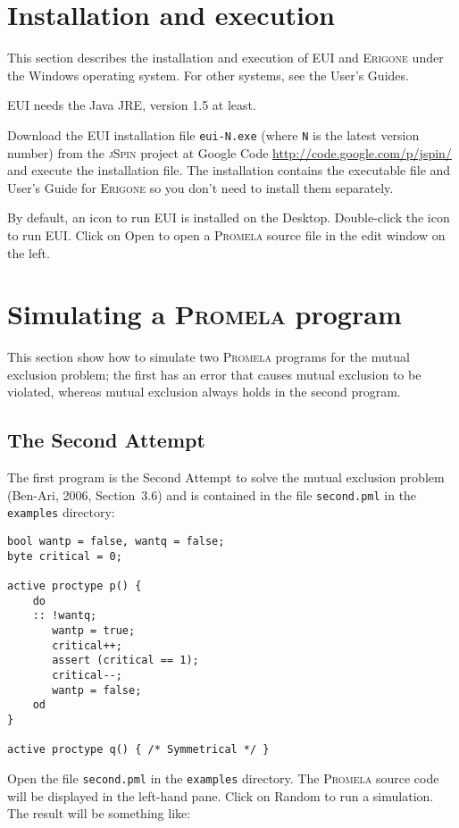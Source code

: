 \documentclass[11pt]{article}
\newcommand*{\prg}{\textsc{Erigone}}
\newcommand*{\eui}{\textsc{EUI}}
\newcommand*{\jsp}{\textsc{jSpin}}
\newcommand*{\prm}{\textsc{Promela}}
\newcommand*{\p}[1]{\texttt{#1}}
\newcommand*{\bu}[1]{\textsf{#1}}
\begin{document}
\section{Installation and execution}

This section describes the installation and execution of \eui{} and \prg{}
under the Windows operating system. For other systems, see the User's Guides.

\eui{} needs the Java JRE, version 1.5 at least. 

Download the \eui{} installation file \p{eui-N.exe} (where \p{N} is the
latest version number) from the \jsp{} project at Google Code
\url{http://code.google.com/p/jspin/} and execute the installation file.
The installation contains the executable file and User's Guide for
\prg{} so you don't need to install them separately.

By default, an icon to run \eui{} is installed on the Desktop.
Double-click the icon to run \eui{}. Click on \bu{Open} to open a \prm{}
source file in the edit window on the left.

\section{Simulating a \prm{} program}

This section show how to simulate two \prm{} programs for the mutual
exclusion problem; the first has an error that causes mutual exclusion
to be violated, whereas mutual exclusion always holds in the second
program.

\subsection*{The Second Attempt}

The first program is the Second Attempt to solve the mutual
exclusion problem (Ben-Ari, 2006, Section~3.6) and is contained in
the file \p{second.pml} in the \p{examples} directory:

\begin{verbatim}
bool wantp = false, wantq = false;
byte critical = 0; 

active proctype p() {
    do 
    :: !wantq;
       wantp = true;
       critical++;
       assert (critical == 1);
       critical--;
       wantp = false;
    od
}

active proctype q() { /* Symmetrical */ }
\end{verbatim}

Open the file \p{second.pml} in the \p{examples} directory. The \prm{}
source code will be displayed in the left-hand pane. Click on
\bu{Random} to run a simulation. The result will be something like:
\end{document}
